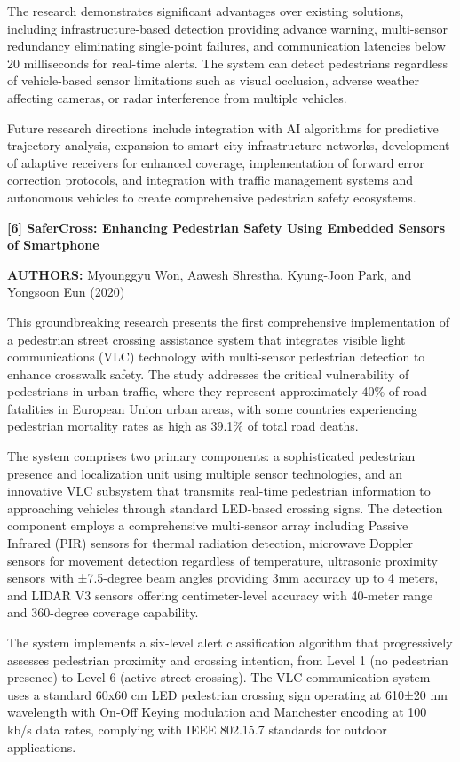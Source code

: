 \documentclass[a4paper, 12pt]{report}
\begin{document}
The research demonstrates significant advantages over existing solutions, including infrastructure-based detection providing advance warning, multi-sensor redundancy eliminating single-point failures, and communication latencies below 20 milliseconds for real-time alerts. The system can detect pedestrians regardless of vehicle-based sensor limitations such as visual occlusion, adverse weather affecting cameras, or radar interference from multiple vehicles.

Future research directions include integration with AI algorithms for predictive trajectory analysis, expansion to smart city infrastructure networks, development of adaptive receivers for enhanced coverage, implementation of forward error correction protocols, and integration with traffic management systems and autonomous vehicles to create comprehensive pedestrian safety ecosystems.

\noindent \textbf{[6] SaferCross: Enhancing Pedestrian Safety Using Embedded Sensors of Smartphone}

\textbf{AUTHORS:} Myounggyu Won, Aawesh Shrestha, Kyung-Joon Park, and Yongsoon Eun (2020)



This groundbreaking research presents the first comprehensive implementation of a pedestrian street crossing assistance system that integrates visible light communications (VLC) technology with multi-sensor pedestrian detection to enhance crosswalk safety. The study addresses the critical vulnerability of pedestrians in urban traffic, where they represent approximately 40\% of road fatalities in European Union urban areas, with some countries experiencing pedestrian mortality rates as high as 39.1\% of total road deaths.

The system comprises two primary components: a sophisticated pedestrian presence and localization unit using multiple sensor technologies, and an innovative VLC subsystem that transmits real-time pedestrian information to approaching vehicles through standard LED-based crossing signs. The detection component employs a comprehensive multi-sensor array including Passive Infrared (PIR) sensors for thermal radiation detection, microwave Doppler sensors for movement detection regardless of temperature, ultrasonic proximity sensors with ±7.5-degree beam angles providing 3mm accuracy up to 4 meters, and LIDAR V3 sensors offering centimeter-level accuracy with 40-meter range and 360-degree coverage capability.

The system implements a six-level alert classification algorithm that progressively assesses pedestrian proximity and crossing intention, from Level 1 (no pedestrian presence) to Level 6 (active street crossing). The VLC communication system uses a standard 60x60 cm LED pedestrian crossing sign operating at 610±20 nm wavelength with On-Off Keying modulation and Manchester encoding at 100 kb/s data rates, complying with IEEE 802.15.7 standards for outdoor applications.
\end{document}
